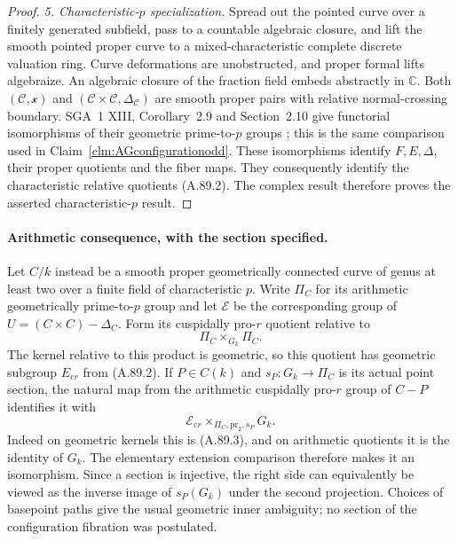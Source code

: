 \documentclass[11pt]{article}
\begin{document}
\begin{proof}
\emph{5. Characteristic-\(p\) specialization.}
Spread out the pointed curve over a finitely generated
subfield, pass to a countable algebraic closure, and lift
the smooth pointed proper curve to a mixed-characteristic
complete discrete valuation ring. Curve deformations are
unobstructed, and proper formal lifts algebraize. An
algebraic closure of the fraction field embeds abstractly
in \(\mathbb C\). Both
\((\mathcal C,\mathcal x)\) and
\((\mathcal C\times\mathcal C,\Delta_{\mathcal C})\)
are smooth proper pairs with relative normal-crossing
boundary. SGA~1 XIII, Corollary~2.9 and Section~2.10 give
functorial isomorphisms of their geometric prime-to-\(p\)
groups \cite{AR_SGA1}; this is the same comparison used
in Claim~\ref{clm:AGconfigurationodd}.
These isomorphisms identify \(F,E,\Delta\), their proper
quotients and the fiber maps. They consequently identify
the characteristic relative quotients (A.89.2).
The complex result therefore proves the asserted
characteristic-\(p\) result.
\end{proof}

\paragraph{Arithmetic consequence, with the section specified.}
Let \(C/k\) instead be a smooth proper geometrically
connected curve of genus at least two over a finite field
of characteristic \(p\). Write \(\Pi_C\) for its
arithmetic geometrically prime-to-\(p\) group and let
\(\mathcal E\) be the corresponding group of
\(U=(C\times C)-\Delta_C\). Form its cuspidally
pro-\(r\) quotient relative to
\[
                \Pi_C\times_{G_k}\Pi_C.
                                                        \tag{A.89.13}
\]
The kernel relative to this product is geometric, so this
quotient has geometric subgroup \(E_{\mathrm{c}r}\)
from (A.89.2). If \(P\in C(k)\) and
\(s_P:G_k\to\Pi_C\) is its actual point section,
the natural map from the arithmetic cuspidally pro-\(r\)
group of \(C-P\) identifies it with
\[
       \mathcal E_{\mathrm{c}r}
                  \times_{\Pi_C,\mathrm{pr}_2,s_P}G_k.
                                                        \tag{A.89.14}
\]
Indeed on geometric kernels this is (A.89.3), and on
arithmetic quotients it is the identity of \(G_k\).
The elementary extension comparison therefore makes it
an isomorphism. Since a section is injective, the right
side can equivalently be viewed as the inverse image of
\(s_P(G_k)\) under the second projection. Choices of
basepoint paths give the usual geometric inner ambiguity;
no section of the configuration fibration was postulated.
\end{document}
